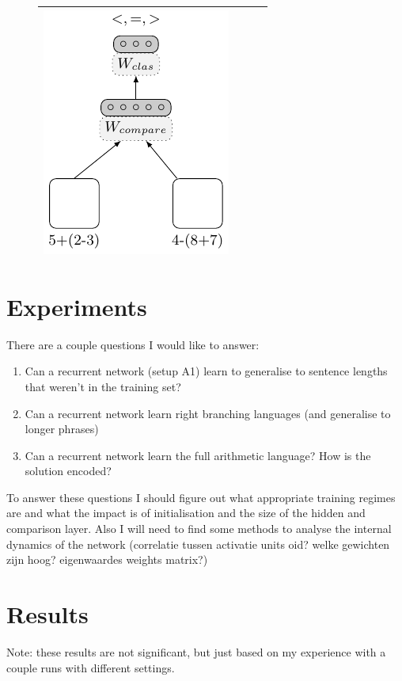 \documentclass{article}
\begin{document}
\begin{figure}[!ht]
\begin{tabular}{|cccc|}
    \includegraphics[scale=0.9]{A4}\\
\hline
\end{tabular}
\end{figure}


\section{Experiments}

There are a couple questions I would like to answer:\begin{enumerate}
\item Can a recurrent network (setup A1) learn to generalise to sentence lengths that weren't in the training set?
\item Can a recurrent network learn right branching languages (and generalise to longer phrases)
\item Can a recurrent network learn the full arithmetic language? How is the solution encoded?
\end{enumerate}

To answer these questions I should figure out what appropriate training regimes are and what the impact is of initialisation and the size of the hidden and comparison layer. Also I will need to find some methods to analyse the internal dynamics of the network (correlatie tussen activatie units oid? welke gewichten zijn hoog? eigenwaardes weights matrix?)

\section{Results}

Note: these results are not significant, but just based on my experience with a couple runs with different settings.\\
\end{document}
